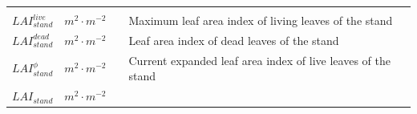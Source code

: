 \documentclass[]{book}
\begin{document}
\begin{longtable}[]{@{}llll@{}}
\begin{minipage}[t]{0.45\columnwidth}
\end{minipage}\tabularnewline
\begin{minipage}[t]{0.11\columnwidth}\raggedright\strut
\(LAI^{live}_{stand}\)\strut
\end{minipage} & \begin{minipage}[t]{0.10\columnwidth}\raggedright\strut
\(m^2 \cdot m^{-2}\)\strut
\end{minipage} & \begin{minipage}[t]{0.12\columnwidth}\raggedright\strut
\strut
\end{minipage} & \begin{minipage}[t]{0.45\columnwidth}\raggedright\strut
Maximum leaf area index of living leaves of the stand\strut
\end{minipage}\tabularnewline
\begin{minipage}[t]{0.11\columnwidth}\raggedright\strut
\(LAI^{dead}_{stand}\)\strut
\end{minipage} & \begin{minipage}[t]{0.10\columnwidth}\raggedright\strut
\(m^2 \cdot m^{-2}\)\strut
\end{minipage} & \begin{minipage}[t]{0.12\columnwidth}\raggedright\strut
\strut
\end{minipage} & \begin{minipage}[t]{0.45\columnwidth}\raggedright\strut
Leaf area index of dead leaves of the stand\strut
\end{minipage}\tabularnewline
\begin{minipage}[t]{0.11\columnwidth}\raggedright\strut
\(LAI^{\phi}_{stand}\)\strut
\end{minipage} & \begin{minipage}[t]{0.10\columnwidth}\raggedright\strut
\(m^2 \cdot m^{-2}\)\strut
\end{minipage} & \begin{minipage}[t]{0.12\columnwidth}\raggedright\strut
\strut
\end{minipage} & \begin{minipage}[t]{0.45\columnwidth}\raggedright\strut
Current expanded leaf area index of live leaves of the stand\strut
\end{minipage}\tabularnewline
\begin{minipage}[t]{0.11\columnwidth}\raggedright\strut
\(LAI_{stand}\)\strut
\end{minipage} & \begin{minipage}[t]{0.10\columnwidth}\raggedright\strut
\(m^2 \cdot m^{-2}\)\strut

\end{minipage}
\end{longtable}
\end{document}
